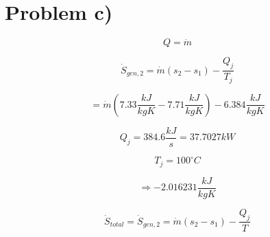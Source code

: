 \section*{Problem c)}

\begin{equation*}
Q = \dot{m}
\end{equation*}

\begin{equation*}
\dot{S}_{gen,2} = \dot{m} (s_{2} - s_{1}) - \frac{Q_{j}}{T_{j}}
\end{equation*}

\begin{equation*}
= \dot{m} (7.33 \frac{kJ}{kgK} - 7.71 \frac{kJ}{kgK}) - 6.384 \frac{kJ}{kgK}
\end{equation*}

\begin{equation*}
Q_{j} = 384.6 \frac{kJ}{s} = 37.7027 kW
\end{equation*}

\begin{equation*}
T_{j} = 100^\circ C
\end{equation*}

\begin{equation*}
\Rightarrow -2.016231 \frac{kJ}{kgK}
\end{equation*}

\begin{equation*}
\dot{S}_{total} = \dot{S}_{gen,2} = \dot{m} \left( s_{2} - s_{1} \right) - \frac{Q_{j}}{T}
\end{equation*}